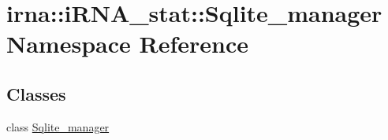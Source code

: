 \hypertarget{namespaceirna_1_1iRNA__stat_1_1Sqlite__manager}{
\section{irna\-:\-:i\-R\-N\-A\-\_\-stat\-:\-:\-Sqlite\-\_\-manager \-Namespace \-Reference}
\label{namespaceirna_1_1iRNA__stat_1_1Sqlite__manager}
}
\subsection*{\-Classes}
\begin{DoxyCompactItemize}
\item 
class \hyperlink{classirna_1_1iRNA__stat_1_1Sqlite__manager_1_1Sqlite__manager}{\-Sqlite\-\_\-manager}
\end{DoxyCompactItemize}
